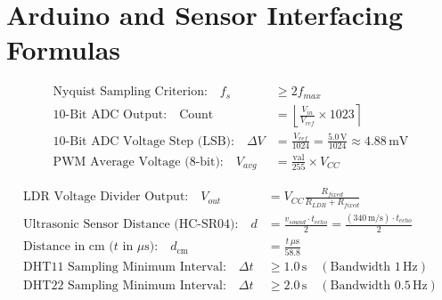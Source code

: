 \chapter{Arduino and Sensor Interfacing Formulas}

\begin{formulabox}
\begin{align}
\text{Nyquist Sampling Criterion:} \quad f_s &\ge 2 f_{max} \\
\text{10-Bit ADC Output:} \quad \text{Count} &= \left\lfloor \frac{V_{in}}{V_{ref}} \times 1023 \right\rceil \\
\text{10-Bit ADC Voltage Step (LSB):} \quad \Delta V &= \frac{V_{ref}}{1024} = \frac{5.0\,\text{V}}{1024} \approx 4.88\,\text{mV} \\
\text{PWM Average Voltage (8-bit):} \quad V_{avg} &= \frac{\text{val}}{255} \times V_{CC}
\end{align}
\end{formulabox}

\begin{formulabox}
\begin{align}
\text{LDR Voltage Divider Output:} \quad V_{out} &= V_{CC} \frac{R_{fixed}}{R_{LDR} + R_{fixed}} \\
\text{Ultrasonic Sensor Distance (HC-SR04):} \quad d &= \frac{v_{sound} \cdot t_{echo}}{2} = \frac{(340\,\text{m/s}) \cdot t_{echo}}{2} \\
\text{Distance in cm ($t$ in }\mu\text{s):} \quad d_{\text{cm}} &= \frac{t\,\mu\text{s}}{58.8} \\
\text{DHT11 Sampling Minimum Interval:} \quad \Delta t &\ge 1.0\,\text{s} \quad (\text{Bandwidth } 1\,\text{Hz}) \\
\text{DHT22 Sampling Minimum Interval:} \quad \Delta t &\ge 2.0\,\text{s} \quad (\text{Bandwidth } 0.5\,\text{Hz})
\end{align}
\end{formulabox}
